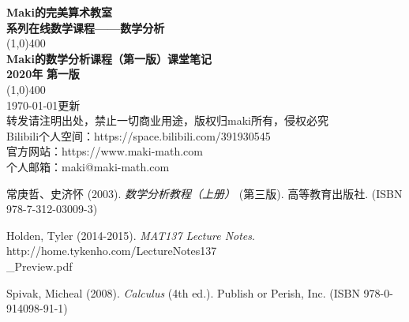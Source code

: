 \documentclass[11pt]{article}
\begin{document}
\begin{titlepage}
    \begin{center}
        \vspace*{1cm}
        \Large{\textbf{Maki的完美算术教室}}\\[2mm]
        \large{\textbf{系列在线数学课程——数学分析}}\\
        \vfill
        \line(1,0){400}\\
        \huge{\textbf{Maki的数学分析课程（第一版）课堂笔记}}\\[3mm]
        \large{\textbf{2020年}  \textbf{第一版}}\\[1mm]
        \line(1,0){400}\\[1mm]
        \vfill
        \today 更新\\
        转发请注明出处，禁止一切商业用途，版权归maki所有，侵权必究\\
        Bilibili个人空间：https://space.bilibili.com/391930545\\
        官方网站：https://www.maki-math.com\\
        个人邮箱：maki@maki-math.com\\
    \end{center}
\end{titlepage}
\tableofcontents
\thispagestyle{empty}
\clearpage
\setcounter{page}{1}



\begin{thebibliography}{}

常庚哲、史济怀 (2003).
\textit{数学分析教程（上册）} (第三版).
高等教育出版社. (ISBN 978-7-312-03009-3)

Holden, Tyler (2014-2015).
\textit{MAT137 Lecture Notes}.
http://home.tykenho.com/LectureNotes137\\
\_Preview.pdf


Spivak, Micheal (2008).
\textit{Calculus} (4th ed.).
Publish or Perish, Inc. (ISBN 978-0-914098-91-1)

\end{thebibliography}
\end{document}
